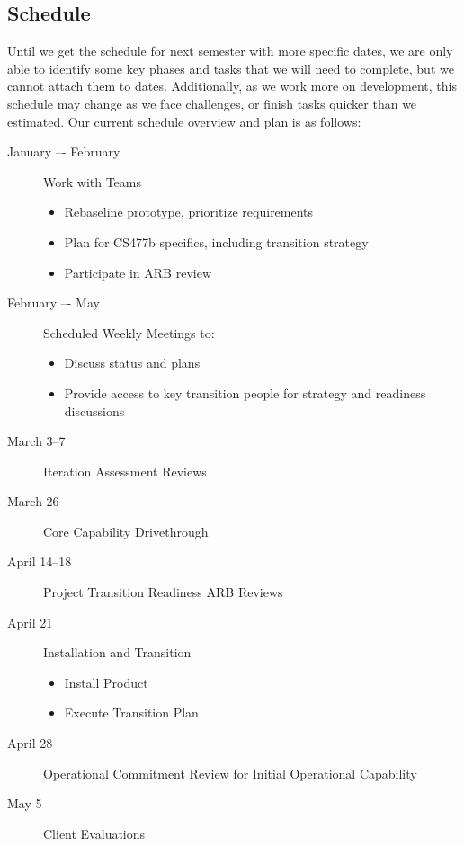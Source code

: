 \subsection{Schedule}
Until we get the schedule for next semester with more specific dates, we are only able to identify some key phases and tasks that we will need to complete, but we cannot attach them to dates. Additionally, as we work more on development, this schedule may change as we face challenges, or finish tasks quicker than we estimated. Our current schedule overview and plan is as follows:\begin{description}
\item[January –- February]Work with Teams\begin{itemize}
	\item Rebaseline prototype, prioritize requirements
	\item Plan for CS477b specifics, including transition strategy
	\item Participate in ARB review
\end{itemize}
\item[February –- May]Scheduled Weekly Meetings to:\begin{itemize}
	\item Discuss status and plans
	\item Provide access to key transition people for strategy and readiness discussions 
\end{itemize}
\item[March 3--7]Iteration Assessment Reviews
\item[March 26]Core Capability Drivethrough
\item[April 14--18]Project Transition Readiness ARB Reviews
\item[April 21]Installation and Transition\begin{itemize}
	\item Install Product
	\item Execute Transition Plan
\end{itemize}
\item[April 28]Operational Commitment Review for Initial Operational Capability
\item[May 5]Client Evaluations
\end{description}

\clearpage

